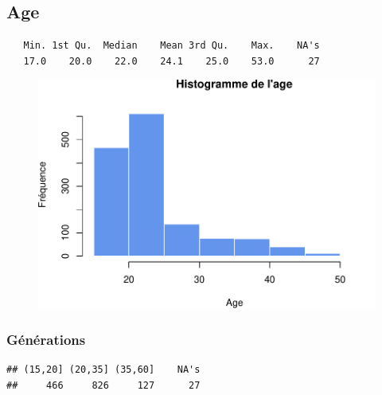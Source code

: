 \documentclass[]{article}
\newenvironment{Shaded}{\begin{snugshade}}{\end{snugshade}}
\newcommand{\KeywordTok}[1]{\textcolor[rgb]{0.13,0.29,0.53}{\textbf{{#1}}}}
\newcommand{\DecValTok}[1]{\textcolor[rgb]{0.00,0.00,0.81}{{#1}}}
\newcommand{\StringTok}[1]{\textcolor[rgb]{0.31,0.60,0.02}{{#1}}}
\newcommand{\CommentTok}[1]{\textcolor[rgb]{0.56,0.35,0.01}{\textit{{#1}}}}
\newcommand{\NormalTok}[1]{{#1}}
\begin{document}
\subsection{Age}\label{age}

\begin{verbatim}
   Min. 1st Qu.  Median    Mean 3rd Qu.    Max.    NA's 
   17.0    20.0    22.0    24.1    25.0    53.0      27 
\end{verbatim}

\begin{figure}[htbp]
\centering
\includegraphics{qs_etudiants_files/figure-latex/age-1.pdf}
\end{figure}

\subsubsection{Générations}\label{generations}

\begin{Shaded}
\end{Shaded}

\begin{verbatim}
## (15,20] (20,35] (35,60]    NA's 
##     466     826     127      27
\end{verbatim}
\end{document}
